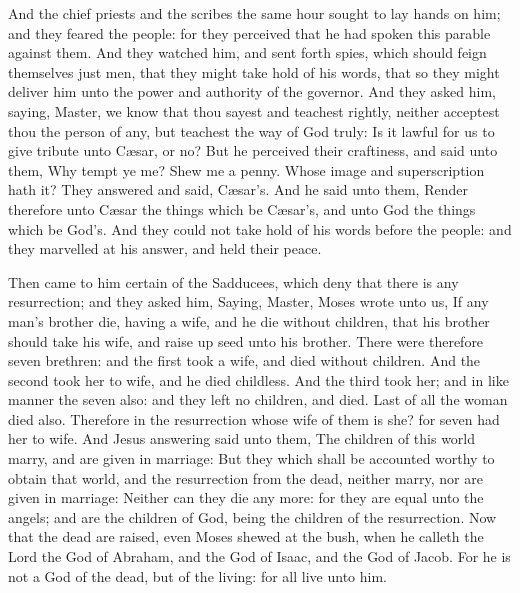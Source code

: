  And the chief priests and the scribes the same hour
sought to lay hands on him; and they feared the people: for they
perceived that he had spoken this parable against them. 
And they watched him, and sent forth spies, which should feign
themselves just men, that they might take hold of his words, that so
they might deliver him unto the power and authority of the governor.
 And they asked him, saying, Master, we know that thou
sayest and teachest rightly, neither acceptest thou the person of any,
but teachest the way of God truly:  Is it lawful for us
to give tribute unto Cæsar, or no?  But he perceived
their craftiness, and said unto them, Why tempt ye me? 
Shew me a penny. Whose image and superscription hath it? They answered
and said, Cæsar's.  And he said unto them, Render
therefore unto Cæsar the things which be Cæsar's, and unto God the
things which be God's.  And they could not take hold of
his words before the people: and they marvelled at his answer, and held
their peace.

 Then came to him certain of the Sadducees, which deny
that there is any resurrection; and they asked him, 
Saying, Master, Moses wrote unto us, If any man's brother die, having a
wife, and he die without children, that his brother should take his
wife, and raise up seed unto his brother.  There were
therefore seven brethren: and the first took a wife, and died without
children.  And the second took her to wife, and he died
childless.  And the third took her; and in like manner
the seven also: and they left no children, and died. 
Last of all the woman died also.  Therefore in the
resurrection whose wife of them is she? for seven had her to wife.
 And Jesus answering said unto them, The children of this
world marry, and are given in marriage:  But they which
shall be accounted worthy to obtain that world, and the resurrection
from the dead, neither marry, nor are given in marriage: 
Neither can they die any more: for they are equal unto the angels; and
are the children of God, being the children of the resurrection.
 Now that the dead are raised, even Moses shewed at the
bush, when he calleth the Lord the God of Abraham, and the God of Isaac,
and the God of Jacob.  For he is not a God of the dead,
but of the living: for all live unto him.

